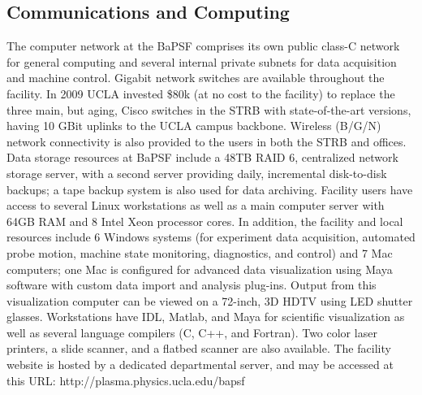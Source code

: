 \documentclass[11pt]{article}
\begin{document}
 \subsection{Communications and Computing}
The computer network at the BaPSF comprises its own public class-C network for general computing and several internal private subnets for data acquisition and machine control. Gigabit network switches are available throughout the facility. In 2009 UCLA invested \$80k (at no cost to the facility) to replace the three main, but aging, Cisco switches in the STRB with state-of-the-art versions, having 10 GBit uplinks to the UCLA campus backbone. Wireless (B/G/N) network connectivity is also provided to the users in both the STRB and offices. 
	Data storage resources at BaPSF include a 48TB RAID 6, centralized network storage server, with a second server providing daily, incremental disk-to-disk backups; a tape backup system is also used for data archiving. Facility users have access to several Linux workstations as well as a main computer server with 64GB RAM and 8 Intel Xeon processor cores. In addition, the facility and local resources include 6 Windows systems (for experiment data acquisition, automated probe motion, machine state monitoring, diagnostics, and control) and 7 Mac computers; one Mac is configured for advanced data visualization using Maya software with custom data import and analysis plug-ins. Output from this visualization computer can be viewed on a 72-inch, 3D HDTV using LED shutter glasses. Workstations have IDL, Matlab, and Maya for scientific visualization as well as several language compilers (C, C++, and Fortran). Two color laser printers, a slide scanner, and a flatbed scanner are also available.  The facility website is hosted by a dedicated departmental server, and may be accessed at this URL: http://plasma.physics.ucla.edu/bapsf



%
%
%
%  
\end{document}
